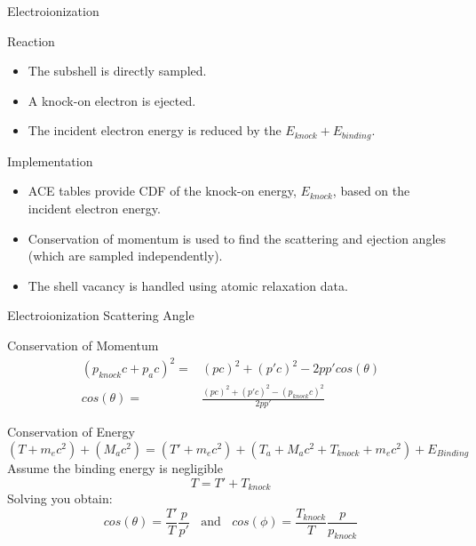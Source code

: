 \documentclass{beamer}
\begin{document}
\begin{frame}{Electroionization}

  \begin{block}{Reaction}
    \begin{itemize}
      \item The subshell is directly sampled.
      \item A knock-on electron is ejected.
      \item The incident electron energy is reduced by the $E_{knock} + E_{binding}$.
      \end{itemize}
  \end{block}  
      
  \begin{block}{Implementation}
    \begin{itemize}
      \item ACE tables provide CDF of the knock-on energy, $E_{knock}$, based on the incident electron energy.
      \item Conservation of momentum is used to find the scattering and ejection angles (which are sampled independently).
      \item The shell vacancy is handled using atomic relaxation data. 
    \end{itemize}
  \end{block}  

\end{frame}

\begin{frame}{Electroionization Scattering Angle}

{\large Conservation of Momentum}
  \begin{align}
    (p_{knock}c + p_{a}c)^2 = & (pc)^2 + (p'c)^2 - 2pp'cos(\theta) \nonumber \\
   cos(\theta) = & \frac{(pc)^2 + (p'c)^2 - (p_{knock}c)^2}{2pp'}  \nonumber
  \end{align}

{\large Conservation of Energy}
  \begin{equation*}
    (T + m_ec^2) + (M_ac^2) =(T' + m_ec^2) + (T_a + M_ac^2 + T_{knock} + m_ec^2) + E_{Binding}
  \end{equation*}
Assume the binding energy is negligible 
  \begin{equation*}
    T = T' + T_{knock}
  \end{equation*}
  Solving you obtain:
  $$ cos(\theta) = \frac{T'}{T}\frac{p}{p'}~~~~\text{and}~~~~
  cos(\phi)=\frac{T_{knock}}{T}\frac{p}{p_{knock}}$$


\end{frame}
\end{document}
